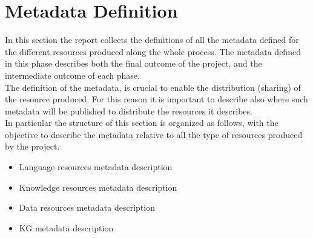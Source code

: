 \section{Metadata Definition}

In this section the report collects the definitions of all the metadata defined for the different resources produced along the whole process. The metadata defined in this phase describes both the final outcome of the project, and the intermediate outcome of each phase.\\

\noindent The definition of the metadata, is crucial to enable the distribution (sharing) of the resource produced. For this reason it is important to describe also where such metadata will be published to distribute the resources it describes. \\

\noindent In particular the structure of this section is organized as follows, with the objective to describe the metadata relative to all the type of resources produced by the project.\\
\begin{itemize}
    \item Language resources metadata description
    \item Knowledge resources metadata description
    \item Data resources metadata description
    \item KG metadata description
\end{itemize}



